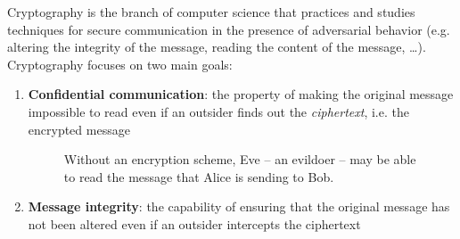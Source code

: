 \documentclass[a4paper, 12pt]{report}
\begin{document}
    Cryptography is the branch of computer science that practices and studies techniques for secure communication in the presence of adversarial behavior (e.g. altering the integrity of the message, reading the content of the message, \dots). Cryptography focuses on two main goals:
    \begin{enumerate}
        \item \textbf{Confidential communication}: the property of making the original message impossible to read even if an outsider finds out the \textit{ciphertext}, i.e. the encrypted message
        
        \begin{figure}[H]
            \centering


            \caption{Without an encryption scheme, Eve -- an evildoer -- may be able to read the message that Alice is sending to Bob.}
        \end{figure}

        \item \textbf{Message integrity}: the capability of ensuring that the original message has not been altered even if an outsider intercepts the ciphertext
        
        \begin{figure}[H]
            \centering

\end{figure}
\end{enumerate}
\end{document}
